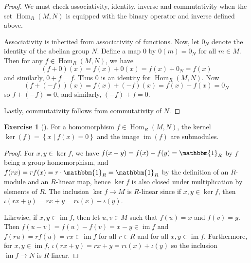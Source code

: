 \documentclass[reqno]{amsart}
\theoremstyle{definition}
\newtheorem{exercise}[theorem]{Exercise}
\theoremstyle{remark}
\DeclareMathOperator{\im}{im}
\DeclareMathOperator{\Hom}{Hom}
\begin{document}
    \begin{proof}
        We must check associativity, identity, inverse and
        commutativity when
        the set  $\Hom_R (M,N)$ is equipped with the
        binary operator and inverse defined above.


        Associativity is inherited from associativity of
        functions. 
        Now, let
        $0_N$ denote the identity of
        the abelian group $N$. Define a map
        $0$ by
        $0 (m)=
         0_N$ for all $m \in M$.
        Then
        for any $f \in \Hom_R(M,N)$, we have
        \[
            (f+ 0)(x)
            = f(x) + 0(x)
            = f(x) + 0_N
            = f(x)
        \] 
        and similarly, $0 + f = f$. Thus
        $0$ is an identity for
        $\Hom_R (M,N)$. 
        Now
        \[
            \left( f + (-f) \right) (x)
            = f(x) + (-f)(x)
            = f(x) - f(x)
            = 0_N
        \] 
        so $f+ (-f) = 0$, and similarly,
        $(-f) + f = 0$.

        Lastly, commutativity follows from commutativity
        of $N$.
    \end{proof}

    \begin{exercise}[]
        For a homomorphism $f \in \Hom_R(M,N)$, the kernel
        $\ker (f) = \left\{ x  \mid 
        f(x) = 0 \right\} $ and the
        image $\im (f)$ are submodules.
    \end{exercise}

    \begin{proof}
        For $x,y \in \ker f$, we have
        $f(x-y) = f(x) - f(y) = \mathbbm{1}_R$ by
        $f$ being a group homomorphism, and
        $f(rx) = r f(x) = r \cdot \mathbbm{1}_R = \mathbbm{1}_R$
        by the definition of an $R$-module and an
        $R$-linear map, hence
        $\ker f$ is also closed under multiplication by
        elements of $R$. The inclusion
        $\ker f \to M$ is $R$-linear since
        if $x,y \in \ker f$, then
        $\iota (rx+y) = rx+y = r \iota(x) + \iota (y)$.

        Likewise, if $x,y \in \im f$, then let
        $u,v \in M$ such that $f(u) =x$ and
        $f(v) = y$. Then
        $f(u-v) = f(u) - f(v) = x-y \in \im f$ and
        $f(ru) = r f(u) = rx \in \im f$ for all $r \in R$ and
        for all $x,y \in \im f$.
        Furthermore,
        for $x,y \in \im f$,
        $\iota (rx+y) = rx+y = r \iota (x) + \iota (y)$
        so the inclusion $\im f \to N$ is $R$-linear.
    \end{proof}
\end{document}
